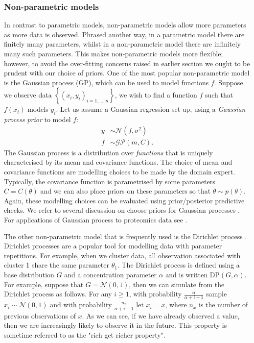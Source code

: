 \documentclass[12pt,english]{article}
\begin{document}
\subsubsection{Non-parametric models}
In contrast to parametric models, non-parametric models allow more parameters as more data is observed. Phrased another way, in a parametric model there are finitely many parameters, whilst in a non-parametric model there are infinitely many such parameters. This makes non-parametric models more flexible; however, to avoid the over-fitting concerns raised in earlier section we ought to be prudent with our choice of priors. One of the most popular non-parametric model is the Gaussian process (GP), which can be used to model functions $f$. Suppose we observe data $\left\{(x_i,y_i)_{i = 1,...,n}\right\}$, we wish to find a function $f$ such that $f(x_i)$ models $y_i$. Let us assume a Gaussian regression set-up, using a \textit{Gaussian process prior} to model $f$:
\begin{equation}
\begin{split}
y &\sim \mathcal{N}(f, \sigma^2)\\
f &\sim \mathcal{GP}(m, C).
\end{split}
\end{equation}
The Gaussian process is a distribution over \textit{functions} that is uniquely characterised by its mean and covariance functions. The choice of mean and covariance functions are modelling choices to be made by the domain expert. Typically, the covariance function is parametrised by some parameters $C = C(\theta)$ and we can also place priors on these parameters so that $\theta \sim p(\theta)$. Again, these modelling choices can be evaluated using prior/posterior predictive checks. We refer to several discussion on choose priors for Gaussian processes \citep{Berger::2001,Paulo::2005, De::2007, Van::2009, Fuglstad::2019}. For applications of Gaussian process to proteomics data see \citet{Maboudi::2017,Crook::2019b, Shin::2020, Fang::2021}.

The other non-parametric model that is frequently used is the Dirichlet process \citep{Ferguson::1973, Antoniak::1974}. Dirichlet processes are a popular tool for modelling data with parameter repetitions. For example, when we cluster data, all observation associated with cluster 1 share the same parameter $\theta_1$. The Dirichlet process is defined using a base distribution $G$ and a concentration parameter $\alpha$ and is written $\text{DP}(G, \alpha)$. For example, suppose that $G = \mathcal{N}(0, 1)$, then we can simulate from the Dirichlet process as follows. For any $i \geq 1$, with probability $\frac{\alpha}{\alpha + i - 1}$ sample $x_i \sim \mathcal{N}(0, 1)$ and with probability $\frac{n_x}{\alpha + i - 1}$  let $x_i = x$, where $n_x$ is the number of previous observations of $x$. As we can see, if we have already observed a value, then we are increasingly likely to observe it in the future. This property is sometime referred to as the "rich get richer property".
\end{document}
